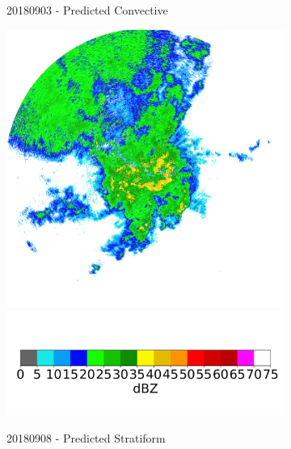 \begin{figure}[h]
\begin{subfigure}[b]{0.45\textwidth}
		\caption{20180903 - Predicted Convective}
		\label{fig:classifying_datadiscovery_ex5}
	\end{subfigure}
	\begin{subfigure}[b]{0.45\textwidth}
		\includegraphics[width=\textwidth]{./thesis_code/plots/midlothian-tx-20180908-173505-ref.png}
		\includegraphics[width=\textwidth]{./thesis_code/plots/dfw_colormap.png}
		\caption{20180908 - Predicted Stratiform}
		\label{fig:classifying_datadiscovery_ex6}
	\end{subfigure}
	\begin{subfigure}[b]{0.45\textwidth}

\end{subfigure}
\end{figure}

